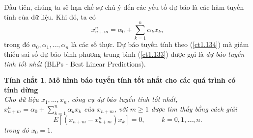 \documentclass[12pt, a4paper,oneside]{book}
\theoremstyle{definition}
\newtheorem{tc}[theo]{Tính chất}
\begin{document}
Đầu tiên, chúng ta sẽ hạn chế sự chú ý đến các yếu tố dự báo là các hàm tuyến tính của dữ liệu. Khi đó, ta có
\begin{equation}
x_{n+m}^n =\alpha_{0} + \sum_{k=1}^{n} \alpha_{k} x_{k}, \label{ct1.134}
\end{equation}
trong đó $\alpha_{0}, \alpha_{1},\dots, \alpha_{n} $ là các số thực. Dự báo tuyến tính theo (\ref{ct1.134}) mà giảm thiểu sai số dự báo bình phương trung bình (\ref{ct1.133}) được gọi là \textit{dự báo tuyến tính tốt nhất} (BLPs - Best Linear Predictions).
\begin{tc}\cite{1} \textbf{\label{BLP}Mô hình báo tuyến tính tốt nhất cho các quá trình có tính dừng}\\
	\textit{Cho dữ liệu $x_{1}, \dots, x_{n}$, công cụ dự báo tuyến tính tốt nhất, $x_{n+m}^n= \alpha_{0} + \sum_{k=1}^{n}\alpha_{k} x_{k}$ của $x_{n+m}$, với $m\geq1$ được tìm thấy bằng cách giải
		\begin{equation}
		E[(x_{n+m} - x_{n+m}^n)x_{k}] = 0, \hspace{1cm} k=0, 1, \dots, n. \label{ct1.135}
		\end{equation}
		trong đó $x_{0}=1$.}
\end{tc}
\end{document}
